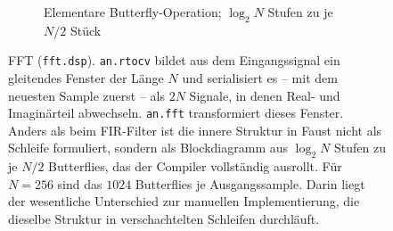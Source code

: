 \begin{figure}[b]
\begin{subfigure}{\textwidth}
\caption{Elementare Butterfly-Operation; $\log_2 N$ Stufen zu je $N/2$ St\"uck}
\end{subfigure}

\caption[Faust-Blockdiagramm der FFT]%
{FFT (\texttt{fft.dsp}). \texttt{an.rtocv} bildet aus dem Eingangssignal ein
gleitendes Fenster der L\"ange $N$ und serialisiert es -- mit dem neuesten
Sample zuerst -- als $2N$ Signale, in denen Real- und Imagin\"arteil
abwechseln. \texttt{an.fft} transformiert dieses Fenster. Anders als beim
FIR-Filter ist die innere Struktur in Faust nicht als Schleife formuliert,
sondern als Blockdiagramm aus $\log_2 N$ Stufen zu je $N/2$ Butterflies, das
der Compiler vollst\"andig ausrollt. F\"ur $N = 256$ sind das $1024$
Butterflies je Ausgangssample. Darin liegt der wesentliche Unterschied zur
manuellen Implementierung, die dieselbe Struktur in verschachtelten
Schleifen durchl\"auft.}
\label{fig:faust-fft}
\end{figure}
